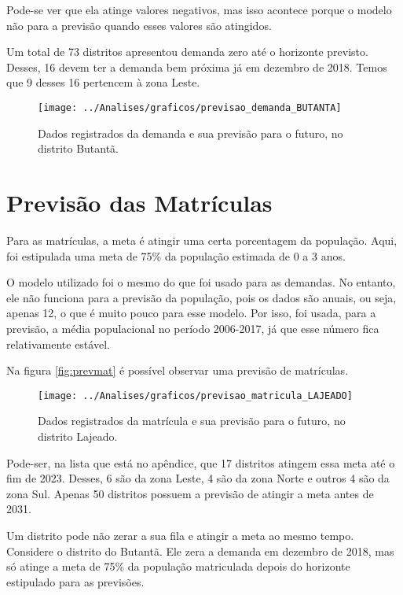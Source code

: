 Pode-se ver que ela atinge valores negativos, mas isso acontece porque o modelo não para a previsão quando esses valores são atingidos.

Um total de 73 distritos apresentou demanda zero até o horizonte previsto. Desses, 16 devem ter a demanda bem próxima já em dezembro de 2018. Temos que 9 desses 16 pertencem à zona Leste.

\begin{figure}[H]
	\centering
	\texttt{[image: ../Analises/graficos/previsao\_demanda\_BUTANTA]}
	\caption{Dados registrados da demanda e sua previsão para o futuro, no distrito Butantã.}
	\label{fig:prevdem}
\end{figure}

\section{Previsão das Matrículas}

Para as matrículas, a meta é atingir uma certa porcentagem da população. Aqui, foi estipulada uma meta de 75\% da população estimada de 0 a 3 anos. 

O modelo utilizado foi o mesmo do que foi usado para as demandas. No entanto, ele não funciona para a previsão da população, pois os dados são anuais, ou seja, apenas 12, o que é muito pouco para esse modelo. Por isso, foi usada, para a previsão, a média populacional no período 2006-2017, já que esse número fica relativamente estável.

Na figura \autoref{fig:prevmat} é possível observar uma previsão de matrículas.

\begin{figure}[H]
	\centering
	\texttt{[image: ../Analises/graficos/previsao\_matricula\_LAJEADO]}
	\caption{Dados registrados da matrícula e sua previsão para o futuro, no distrito Lajeado.}
	\label{fig:prevmat}
\end{figure}

Pode-ser, na lista que está no apêndice, que 17 distritos atingem essa meta até o fim de 2023. Desses, 6 são da zona Leste, 4 são da zona Norte e outros 4 são da zona Sul. Apenas 50 distritos possuem a previsão de atingir a meta antes de 2031.

Um distrito pode não zerar a sua fila e atingir a meta ao mesmo tempo. Considere o distrito do Butantã. Ele zera a demanda em dezembro de 2018, mas só atinge a meta de 75\% da população matriculada depois do horizonte estipulado para as previsões.